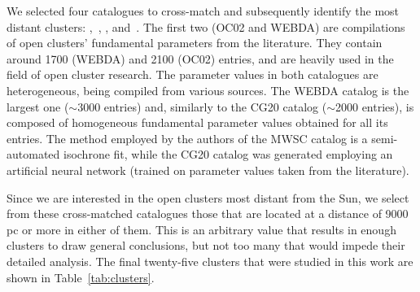 \documentclass{aa}
\begin{document}
 We selected four catalogues to cross-match and subsequently identify the most
 distant clusters: \citet[][New Catalog of Optically Visible Open Clusters and
 Candidates, hereinafter OC02]{Dias_2002},~\citet[][WEBDA,\footnote{
 \url{https://webda.physics.muni.cz/}}]{Netopil_2012},
 \citet[][Milky Way Star Clusters Catalog, hereinafter MWSC]{Kharchenko_2012},
 and~\citet[][hereinafter CG20]{Cantat_2020}.
 The first two (OC02 and WEBDA) are compilations of open clusters' fundamental
 parameters from the literature. They contain around 1700 (WEBDA) and 2100 
 (OC02) entries, and are heavily used in the field of open cluster research.
 The parameter values in both catalogues are heterogeneous, being compiled from
 various sources.
 The WEBDA catalog is the largest one ($\sim$3000 entries) and, similarly to the CG20
 catalog ($\sim$2000 entries), is composed of homogeneous fundamental parameter
 values obtained for all its entries. The method employed by the authors of the
 MWSC catalog is a semi-automated isochrone fit, while the CG20 catalog was
 generated employing an artificial neural network (trained on parameter values
 taken from the literature).

 Since we are interested in the open clusters most distant from the Sun, we
 select from these cross-matched catalogues those that are located at a
 distance of 9000 pc or more in either of them. This is an arbitrary value that
 results in enough clusters to draw general conclusions, but not too many that
 would impede their detailed analysis. The final twenty-five clusters that were
 studied in this work are shown in Table~\ref{tab:clusters}.\\
\end{document}
